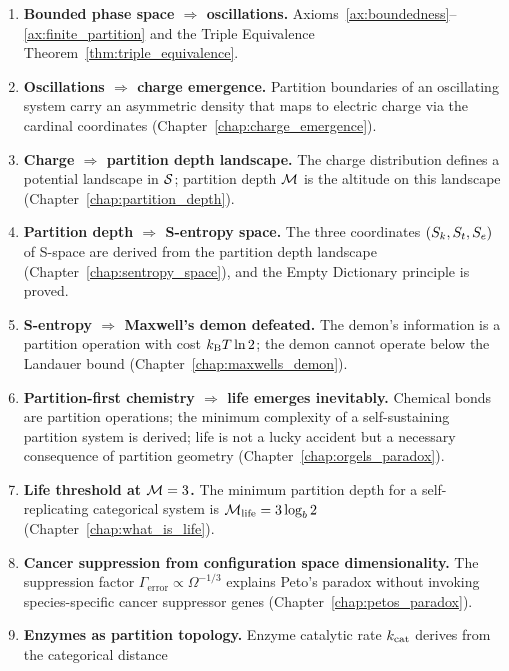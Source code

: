 \begin{enumerate}[label=\textbf{\arabic*.}]
  \item \textbf{Bounded phase space $\Rightarrow$ oscillations.}
        Axioms~\ref{ax:boundedness}--\ref{ax:finite_partition} and the Triple
        Equivalence Theorem~\ref{thm:triple_equivalence}.
  \item \textbf{Oscillations $\Rightarrow$ charge emergence.}
        Partition boundaries of an oscillating system carry an asymmetric
        density that maps to electric charge via the cardinal coordinates
        (Chapter~\ref{chap:charge_emergence}).
  \item \textbf{Charge $\Rightarrow$ partition depth landscape.}
        The charge distribution defines a potential landscape in $\mathcal{S}$;
        partition depth $\mathcal{M}$ is the altitude on this landscape
        (Chapter~\ref{chap:partition_depth}).
  \item \textbf{Partition depth $\Rightarrow$ S-entropy space.}
        The three coordinates $(S_k, S_t, S_e)$ of S-space are derived from
        the partition depth landscape (Chapter~\ref{chap:sentropy_space}), and
        the Empty Dictionary principle is proved.
  \item \textbf{S-entropy $\Rightarrow$ Maxwell's demon defeated.}
        The demon's information is a partition operation with cost $k_{\mathrm{B}} T \ln 2$;
        the demon cannot operate below the Landauer bound
        (Chapter~\ref{chap:maxwells_demon}).
  \item \textbf{Partition-first chemistry $\Rightarrow$ life emerges inevitably.}
        Chemical bonds are partition operations; the minimum complexity of a
        self-sustaining partition system is derived; life is not a lucky accident
        but a necessary consequence of partition geometry
        (Chapter~\ref{chap:orgels_paradox}).
  \item \textbf{Life threshold at $\mathcal{M} = 3$.}
        The minimum partition depth for a self-replicating categorical system
        is $\mathcal{M}_{\mathrm{life}} = 3\log_b 2$ (Chapter~\ref{chap:what_is_life}).
  \item \textbf{Cancer suppression from configuration space dimensionality.}
        The suppression factor $\Gamma_{\mathrm{error}} \propto \Omega^{-1/3}$
        explains Peto's paradox without invoking species-specific cancer
        suppressor genes (Chapter~\ref{chap:petos_paradox}).
  \item \textbf{Enzymes as partition topology.}
        Enzyme catalytic rate $k_{\mathrm{cat}}$ derives from the categorical distance

\end{enumerate}
